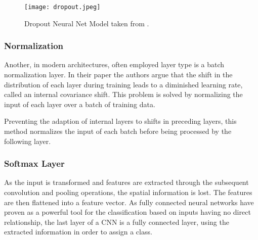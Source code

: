 \begin{figure}[H]
	\centering
	\texttt{[image: dropout.jpeg]}
	 \caption{Dropout Neural Net Model taken from \cite{DropoutOriginal}.}
 \label{DropoutDiagram}
\end{figure}



\subsubsection{Normalization}


Another, in modern architectures, often employed layer type is a batch normalization layer. In their paper \cite{Szegedy2015} the authors argue that the shift in the distribution of each layer during training leads to a diminished learning rate, called an internal covariance shift. This problem is solved by normalizing the input of each layer over a batch of training data. 


Preventing the adaption of internal layers to shifts in preceding layers, this method normalizes the input of each batch before being processed by the following layer. 




\subsubsection{Softmax Layer}

As the input is transformed and features are extracted through the subsequent convolution and pooling operations, the spatial information is lost. The features are then flattened into a feature vector. As fully connected neural networks have proven as a powerful tool for the classification based on inputs having no direct relationship, the last layer of a CNN is a fully connected layer, using the extracted information in order to assign a class. \\


